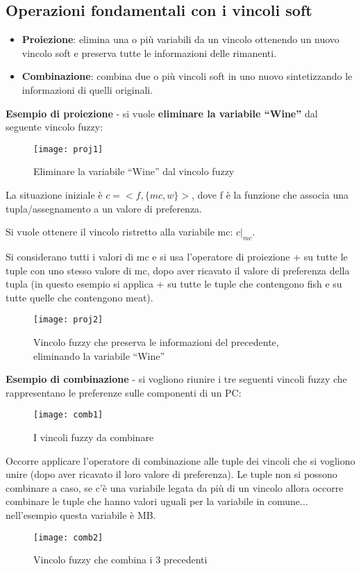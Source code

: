 \subsection{Operazioni fondamentali con i vincoli soft}

\begin{itemize}
 \item \textbf{Proiezione}: elimina una o più variabili da un vincolo
ottenendo un nuovo vincolo soft e preserva tutte le informazioni delle
rimanenti.
 \item \textbf{Combinazione}: combina due o più vincoli soft in uno
nuovo sintetizzando le informazioni di quelli originali.
\end{itemize}

\textbf{Esempio di proiezione} - si vuole \textbf{eliminare la variabile
``Wine''} dal seguente vincolo fuzzy:

\begin{figure}[H]
\centering
\texttt{[image: proj1]}
\caption{Eliminare la variabile ``Wine'' dal vincolo fuzzy}
\label{fig:proj1}
\end{figure}

La situazione iniziale è $c=<f,\{mc,w\}>$, dove f è la funzione che
associa una tupla/assegnamento a un valore di preferenza.

Si vuole ottenere il vincolo ristretto alla variabile mc: $c|_{mc}$.

Si considerano tutti i valori di mc e si usa l'operatore di proiezione +
su tutte le tuple con uno stesso valore di mc, dopo aver ricavato
il valore di preferenza della tupla (in questo esempio si applica + su
tutte le tuple che contengono fish e su tutte quelle che contengono meat).

\begin{figure}[H]
\centering
\texttt{[image: proj2]}
\caption{Vincolo fuzzy che preserva le informazioni del precedente, eliminando
la variabile ``Wine''}
\label{fig:proj2}
\end{figure}

\textbf{Esempio di combinazione} - si vogliono riunire i tre seguenti vincoli
fuzzy che rappresentano le preferenze sulle componenti di un PC:

\begin{figure}[H]
\centering
\texttt{[image: comb1]}
\caption{I vincoli fuzzy da combinare}
\label{fig:comb1}
\end{figure}

Occorre applicare l'operatore di combinazione alle tuple dei vincoli
che si vogliono unire (dopo aver ricavato il loro valore di preferenza).
Le tuple non si possono combinare a caso, se c'è una variabile legata
da più di un vincolo allora occorre combinare le tuple che hanno valori
uguali per la variabile in comune... nell'esempio questa variabile è MB.

\begin{figure}[H]
\centering
\texttt{[image: comb2]}
\caption{Vincolo fuzzy che combina i 3 precedenti}
\label{fig:comb2}
\end{figure}
